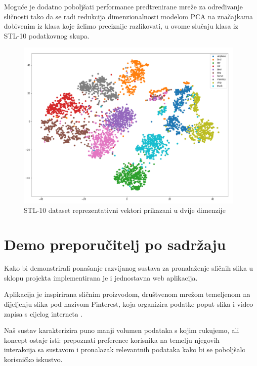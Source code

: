 \documentclass[times, utf8, proizvoljni, numeric]{fer}
\begin{document}
Moguće je dodatno poboljšati performance predtrenirane mreže za određivanje sličnosti tako da se radi redukcija dimenzionalnosti modelom PCA na značajkama dobivenim iz klasa koje želimo preciznije razlikovati, u ovome slučaju klasa iz STL-10 podatkovnog skupa.

\begin{figure}[!ht]
	\begin{center}
		\captionsetup{justification=centering}
		\includegraphics[width=1.\textwidth]{./imgs/stl_10_tsne.png}
		\caption{STL-10 dataset reprezentativni vektori prikazani u dvije dimenzije}
		\label{fg:stl_10_tsne}
	\end{center}
\end{figure}

\chapter{Demo preporučitelj po sadržaju}

Kako bi demonstrirali ponašanje razvijanog sustava za pronalaženje sličnih slika u sklopu projekta implementirana je i jednostavna web aplikacija. 

Aplikacija je inspirirana sličnim proizvodom, društvenom mrežom temeljenom na dijeljenju slika pod nazivom Pinterest, koja organizira podatke poput slika i video zapisa s cijelog interneta \cite{wiki-pintrest}. 

Naš sustav karakterizira puno manji volumen podataka s kojim rukujemo, ali koncept ostaje isti: prepoznati preference korisnika na temelju njegovih interakcija sa sustavom i pronalazak relevantnih podataka kako bi se poboljšalo korisničko iskustvo.
\end{document}
